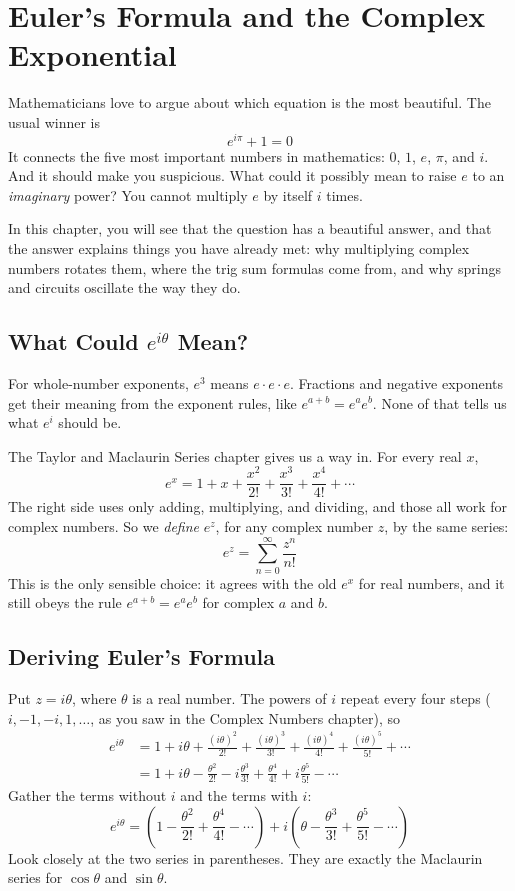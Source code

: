 \chapter{Euler's Formula and the Complex Exponential}

Mathematicians love to argue about which equation is the most beautiful. The
usual winner is
$$e^{i\pi} + 1 = 0$$
It connects the five most important numbers in mathematics: $0$, $1$, $e$, $\pi$,
and $i$. And it should make you suspicious. What could it possibly mean to raise
$e$ to an \emph{imaginary} power? You cannot multiply $e$ by itself $i$ times.

In this chapter, you will see that the question has a beautiful answer, and that
the answer explains things you have already met: why multiplying complex numbers
rotates them, where the trig sum formulas come from, and why springs and circuits
oscillate the way they do.

\section{What Could $e^{i\theta}$ Mean?}
For whole-number exponents, $e^3$ means $e \cdot e \cdot e$. Fractions and negative
exponents get their meaning from the exponent rules, like
$e^{a+b} = e^a e^b$. None of that tells us what $e^{i}$ should be.

The Taylor and Maclaurin Series chapter gives us a way in. For every real $x$,
$$e^x = 1 + x + \frac{x^2}{2!} + \frac{x^3}{3!} + \frac{x^4}{4!} + \cdots$$
The right side uses only adding, multiplying, and dividing, and those all work
for complex numbers. So we \emph{define} $e^z$, for any complex number $z$, by the
same series:
$$e^z = \sum_{n=0}^\infty \frac{z^n}{n!}$$
This is the only sensible choice: it agrees with the old $e^x$ for real numbers,
and it still obeys the rule $e^{a+b} = e^a e^b$ for complex $a$ and $b$.

\section{Deriving Euler's Formula}
Put $z = i\theta$, where $\theta$ is a real number. The powers of $i$ repeat every
four steps ($i, -1, -i, 1, \dots$, as you saw in the Complex Numbers chapter), so
\begin{align*}
e^{i\theta} &= 1 + i\theta + \frac{(i\theta)^2}{2!} + \frac{(i\theta)^3}{3!} + \frac{(i\theta)^4}{4!} + \frac{(i\theta)^5}{5!} + \cdots \\
&= 1 + i\theta - \frac{\theta^2}{2!} - i\frac{\theta^3}{3!} + \frac{\theta^4}{4!} + i\frac{\theta^5}{5!} - \cdots
\end{align*}
Gather the terms without $i$ and the terms with $i$:
$$e^{i\theta} = \left(1 - \frac{\theta^2}{2!} + \frac{\theta^4}{4!} - \cdots\right) + i\left(\theta - \frac{\theta^3}{3!} + \frac{\theta^5}{5!} - \cdots\right)$$
Look closely at the two series in parentheses. They are exactly the Maclaurin
series for $\cos\theta$ and $\sin\theta$.

